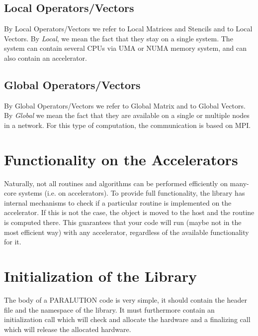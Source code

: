 \subsection{Local Operators/Vectors}

By Local Operators/Vectors we refer to Local Matrices and Stencils and to Local Vectors. By \emph{Local}, we mean the fact that they stay on a single system. The system can contain several CPUs via UMA or NUMA memory system, and can also contain an accelerator. 

\subsection{Global Operators/Vectors}

By Global Operators/Vectors we refer to Global Matrix and to Global Vectors. By \emph{Global} we mean the fact that they are available on a single or multiple nodes in a network. For this type of computation, the communication is based on MPI.

\section{Functionality on the Accelerators}

Naturally, not all routines and algorithms can be performed efficiently on many-core systems (i.e. on accelerators). To provide full functionality, the library has internal mechanisms to check if a particular routine is implemented on the accelerator. If this is not the case, the object is moved to the host and the routine is computed there. This guarantees that your code will run (maybe not in the most efficient way) with any accelerator, regardless of the available functionality for it.



\section{Initialization of the Library}

The body of a PARALUTION code is very simple, it should contain the header file and the namespace of the library. It must furthermore contain an initialization call which will check and allocate the hardware and a finalizing call which will release the allocated hardware.





